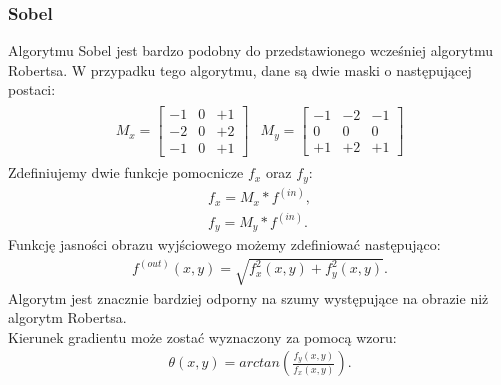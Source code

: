 \subsubsection{Sobel} \label{sssec:sobel}
Algorytmu Sobel jest bardzo podobny do przedstawionego wcześniej algorytmu Robertsa. W przypadku tego algorytmu, dane są dwie maski o następującej postaci:
\begin{gather*}
\begin{matrix}
  M_x = \begin{bmatrix}
    -1 & 0 & +1 \\
    -2 & 0 & +2 \\
    -1 & 0 & +1
  \end{bmatrix}
&
  M_y = \begin{bmatrix}
    -1 & -2 & -1 \\
    0 & 0 & 0 \\
    +1 & +2 & +1
  \end{bmatrix}
\end{matrix}
\end{gather*}
Zdefiniujemy dwie funkcje pomocnicze $f_x$ oraz $f_y$:
\begin{gather*}
  f_x  = M_x * f^{(in)}, \\
  f_y  = M_y * f^{(in)}.
\end{gather*}
Funkcję jasności obrazu wyjściowego możemy zdefiniować następująco:
\begin{gather*}
  f^{(out)}(x, y) = \sqrt{f_x^2(x, y)+f_{y}^2(x, y)}.
\end{gather*}
Algorytm jest znacznie bardziej odporny na szumy występujące na obrazie niż algorytm Robertsa. \\
Kierunek gradientu może zostać wyznaczony za pomocą wzoru:
\begin{gather*}
  \theta(x, y) = arctan(\frac{f_y(x, y)}{f_x(x, y)}).
\end{gather*}
